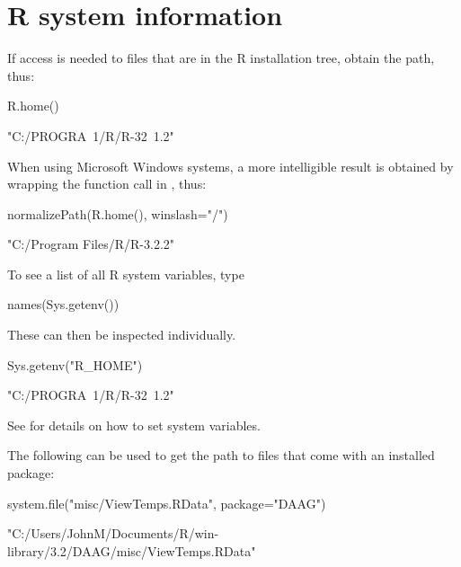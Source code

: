 \section{R system information}

If access is needed to files that are in the R installation tree,
obtain the path, thus:
\begin{Schunk}
\begin{Sinput}
R.home()
\end{Sinput}
\begin{Soutput}
[1] "C:/PROGRA~1/R/R-32~1.2"
\end{Soutput}
\end{Schunk}
When using Microsoft Windows systems, a more intelligible result is
obtained by wrapping the function call in ,
thus: 
\begin{Schunk}
\begin{Sinput}
normalizePath(R.home(), winslash="/")
\end{Sinput}
\begin{Soutput}
[1] "C:/Program Files/R/R-3.2.2"
\end{Soutput}
\end{Schunk}

To see a list of all R system variables, type
\begin{Schunk}
\begin{Sinput}
names(Sys.getenv())
\end{Sinput}
\end{Schunk}
These can then be inspected individually.
\begin{Schunk}
\begin{Sinput}
Sys.getenv("R_HOME")
\end{Sinput}
\begin{Soutput}
[1] "C:/PROGRA~1/R/R-32~1.2"
\end{Soutput}
\end{Schunk}
See  for details on how to set system variables.

The following can be used to get the path to files that come with an installed
package:
\begin{fullwidth}
\begin{Schunk}
\begin{Sinput}
system.file("misc/ViewTemps.RData", package="DAAG")
\end{Sinput}
\begin{Soutput}
[1] "C:/Users/JohnM/Documents/R/win-library/3.2/DAAG/misc/ViewTemps.RData"
\end{Soutput}
\end{Schunk}
\end{fullwidth}

